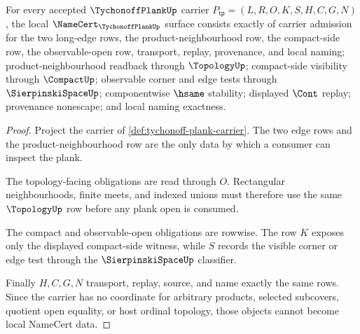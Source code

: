 \begin{theorem}
\label{thm:tychonoff-plank-namecert-obligations}
For every accepted $\TychonoffPlankUp$ carrier $P_{\mathsf{tp}}=(L,R,O,K,S,H,C,G,N)$, the local $\NameCert_{\TychonoffPlankUp}$ surface consists exactly of carrier admission for the two long-edge rows, the product-neighbourhood row, the compact-side row, the observable-open row, transport, replay, provenance, and local naming; product-neighbourhood readback through $\TopologyUp$; compact-side visibility through $\CompactUp$; observable corner and edge tests through $\SierpinskiSpaceUp$; componentwise $\hsame$ stability; displayed $\Cont$ replay; provenance nonescape; and local naming exactness.
\end{theorem}
\begin{proof}
Project the carrier of \autoref{def:tychonoff-plank-carrier}. The two edge rows and the product-neighbourhood row are the only data by which a consumer can inspect the plank.

The topology-facing obligations are read through $O$. Rectangular neighbourhoods, finite meets, and indexed unions must therefore use the same $\TopologyUp$ row before any plank open is consumed.

The compact and observable-open obligations are rowwise. The row $K$ exposes only the displayed compact-side witness, while $S$ records the visible corner or edge test through the $\SierpinskiSpaceUp$ classifier.

Finally $H,C,G,N$ transport, replay, source, and name exactly the same rows. Since the carrier has no coordinate for arbitrary products, selected subcovers, quotient open equality, or host ordinal topology, those objects cannot become local NameCert data.
\end{proof}


\begin{closurestatus}{\TychonoffPlankUp}
  \theoryclosure{\seedClosure}
  \formalstatus{\unformalizedV}
\end{closurestatus}
